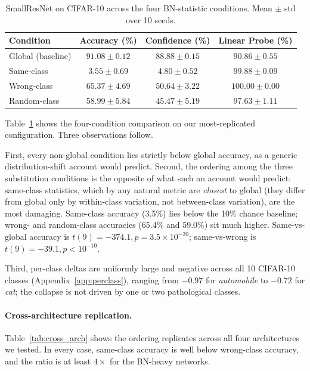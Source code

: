 \documentclass{article}
\begin{document}
\begin{table}[t]
\caption{SmallResNet on CIFAR-10 across the four BN-statistic conditions. Mean $\pm$ std over 10 seeds.}
\label{tab:primary}
\centering
\small
\begin{tabular}{@{}lccc@{}}
\toprule
Condition & Accuracy (\%) & Confidence (\%) & Linear Probe (\%) \\
\midrule
Global (baseline) & $91.08 \pm 0.12$ & $88.88 \pm 0.15$ & $90.86 \pm 0.55$ \\
Same-class        & $\mathbf{3.55 \pm 0.69}$  & $4.80 \pm 0.52$  & $99.88 \pm 0.09$ \\
Wrong-class       & $65.37 \pm 4.69$ & $50.64 \pm 3.22$ & $100.00 \pm 0.00$ \\
Random-class      & $58.99 \pm 5.84$ & $45.47 \pm 5.19$ & $97.63 \pm 1.11$ \\
\bottomrule
\end{tabular}
\end{table}

Table~\ref{tab:primary} shows the four-condition comparison on our most-replicated configuration. Three observations follow.

First, every non-global condition lies strictly below global accuracy, as a generic distribution-shift account would predict. Second, the ordering among the three substitution conditions is the opposite of what such an account would predict: same-class statistics, which by any natural metric are \emph{closest} to global (they differ from global only by within-class variation, not between-class variation), are the most damaging. Same-class accuracy (3.5\%) lies below the 10\% chance baseline; wrong- and random-class accuracies (65.4\% and 59.0\%) sit much higher. Same-vs-global accuracy is $t(9)=-374.1, p=3.5\times 10^{-20}$; same-vs-wrong is $t(9)=-39.1, p<10^{-10}$.

Third, per-class deltas are uniformly large and negative across all 10 CIFAR-10 classes (Appendix~\ref{app:perclass}), ranging from $-0.97$ for \emph{automobile} to $-0.72$ for \emph{cat}; the collapse is not driven by one or two pathological classes.

\paragraph{Cross-architecture replication.} Table~\ref{tab:cross_arch} shows the ordering replicates across all four architectures we tested. In every case, same-class accuracy is well below wrong-class accuracy, and the ratio is at least $4\times$ for the BN-heavy networks.
\end{document}
